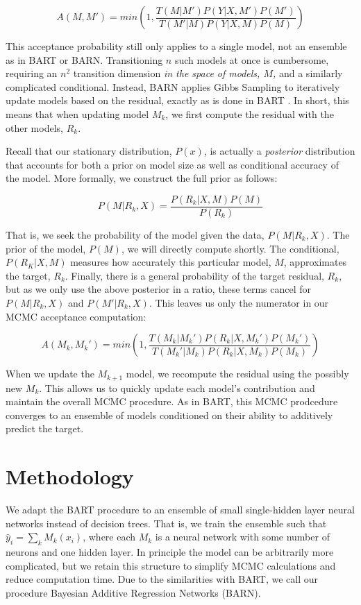 \documentclass[12pt]{article}
\begin{document}
$$
A(M,M') = min(1, \frac{T(M|M') P(Y|X,M')P(M')}{T(M'|M) P(Y|X,M)P(M)})
$$

This acceptance probability still only applies to a single model, not an ensemble as in BART or BARN.  Transitioning $n$ such models at once is cumbersome, requiring an $n^2$ transition dimension \emph{in the space of models, $M$,} and a similarly complicated conditional.  Instead, BARN applies Gibbs Sampling to iteratively update models based on the residual, exactly as is done in BART \cite{chipman2010bart}.  In short, this means that when updating model $M_k$, we first compute the residual with the other models, $R_k$.

Recall that our stationary distribution, $P(x)$, is actually a \emph{posterior} distribution that accounts for both a prior on model size as well as conditional accuracy of the model.  More formally, we construct the full prior as follows:

$$
P(M|R_k,X) = \frac{P(R_k|X,M)P(M)}{P(R_k)}
$$

That is, we seek the probability of the model given the data, $P(M|R_k,X)$.  The prior of the model, $P(M)$, we will directly compute shortly.  The conditional, $P(R_K|X,M)$ measures how accurately this particular model, $M$, approximates the target, $R_k$.  Finally, there is a general probability of the target residual, $R_k$, but as we only use the above posterior in a ratio, these terms cancel for $P(M|R_k,X)$ and $P(M'|R_k,X)$.  This leaves us only the numerator in our MCMC acceptance computation:

$$
A(M_k,M_k') = min(1, \frac{T(M_k|M_k') P(R_k|X,M_k')P(M_k')}{T(M_k'|M_k) P(R_k|X,M_k)P(M_k)})
$$

When we update the $M_{k+1}$ model, we recompute the residual using the possibly new $M_k$.  This allows us to quickly update each model's contribution and maintain the overall MCMC procedure.  As in BART, this MCMC prodcedure converges to an ensemble of models conditioned on their ability to additively predict the target.

\section{Methodology}\label{sec:method}

We adapt the BART procedure \cite{chipman2010bart} to an ensemble of small single-hidden layer neural networks instead of decision trees.  That is, we train the ensemble such that $\hat{y}_i = \sum_k M_k(x_i)$, where each $M_k$ is a neural network with some number of neurons and one hidden layer.  In principle the model can be arbitrarily more complicated, but we retain this structure to simplify MCMC calculations and reduce computation time.  Due to the similarities with BART, we call our procedure Bayesian Additive Regression Networks (BARN).
\end{document}
